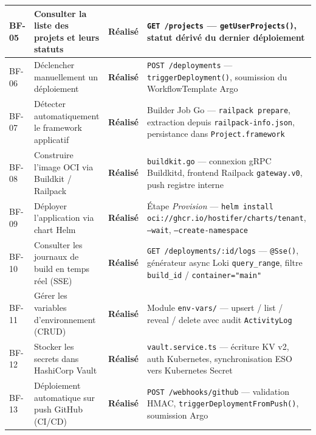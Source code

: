 \begin{longtable}{|p{0.8cm}|p{5.5cm}|p{2.2cm}|p{4.5cm}|}
BF-05
  & Consulter la liste des projets et leurs statuts
  & \textcolor{green!60!black}{\textbf{Réalisé}}
  & \texttt{GET /projects} — \texttt{getUserProjects()}, statut dérivé du dernier déploiement \\
\hline

BF-06
  & Déclencher manuellement un déploiement
  & \textcolor{green!60!black}{\textbf{Réalisé}}
  & \texttt{POST /deployments} — \texttt{triggerDeployment()}, soumission du WorkflowTemplate Argo \\
\hline

BF-07
  & Détecter automatiquement le framework applicatif
  & \textcolor{green!60!black}{\textbf{Réalisé}}
  & Builder Job Go — \texttt{railpack prepare}, extraction depuis \texttt{railpack-info.json}, persistance dans \texttt{Project.framework} \\
\hline

BF-08
  & Construire l'image OCI via Buildkit / Railpack
  & \textcolor{green!60!black}{\textbf{Réalisé}}
  & \texttt{buildkit.go} — connexion gRPC Buildkitd, frontend Railpack \texttt{gateway.v0}, push registre interne \\
\hline

BF-09
  & Déployer l'application via chart Helm
  & \textcolor{green!60!black}{\textbf{Réalisé}}
  & Étape \textit{Provision} — \texttt{helm install oci://ghcr.io/hostifer/charts/tenant}, \texttt{--wait}, \texttt{--create-namespace} \\
\hline

BF-10
  & Consulter les journaux de build en temps réel (SSE)
  & \textcolor{green!60!black}{\textbf{Réalisé}}
  & \texttt{GET /deployments/:id/logs} — \texttt{@Sse()}, générateur async Loki \texttt{query\_range}, filtre \texttt{build\_id} / \texttt{container="main"} \\
\hline

BF-11
  & Gérer les variables d'environnement (CRUD)
  & \textcolor{green!60!black}{\textbf{Réalisé}}
  & Module \texttt{env-vars/} — upsert / list / reveal / delete avec audit \texttt{ActivityLog} \\
\hline

BF-12
  & Stocker les secrets dans HashiCorp Vault
  & \textcolor{green!60!black}{\textbf{Réalisé}}
  & \texttt{vault.service.ts} — écriture KV v2, auth Kubernetes, synchronisation ESO vers Kubernetes Secret \\
\hline

BF-13
  & Déploiement automatique sur push GitHub (CI/CD)
  & \textcolor{green!60!black}{\textbf{Réalisé}}
  & \texttt{POST /webhooks/github} — validation HMAC, \texttt{triggerDeploymentFromPush()}, soumission Argo \\
\hline


\end{longtable}
